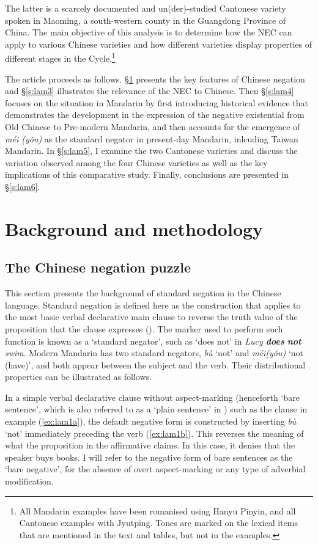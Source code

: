 \documentclass[output=paper,colorlinks,citecolor=brown,chinesefont]{langscibook}
\begin{document}
The latter is a scarcely documented and un(der)-studied Cantonese variety spoken in Maoming, a south-western county in the Guangdong Province of China. The main objective of this analysis is to determine how the NEC can apply to various Chinese varieties and how different varieties display properties of different stages in the Cycle.\footnote{All Mandarin examples have been romanised using Hanyu Pinyin, and all Cantonese examples with Jyutping. Tones are marked on the lexical items that are mentioned in the text and tables, but not in the examples.} 

The article proceeds as follows. §\ref{s:lam2} presents the key features of Chinese negation and §\ref{s:lam3} illustrates the relevance of the NEC to Chinese. Then §\ref{s:lam4} focuses on the situation in Mandarin by first introducing historical evidence that demonstrates the development in the expression of the negative existential from Old Chinese to Pre-modern Mandarin, and then accounts for the emergence of \textit{méi (yǒu)} as the standard negator in present-day Mandarin, inlcuding Taiwan Mandarin. In §\ref{s:lam5}, I examine the two Cantonese varieties and discuss the variation observed among the four Chinese varieties as well as the key implications of this comparative study. Finally, conclusions are presented in §\ref{s:lam6}.

\section{Background and methodology}\label{s:lam2}
\subsection{The Chinese negation puzzle}\label{s:lam2-1}

This section presents the background of standard negation in the Chinese language. Standard negation is defined here as the construction that applies to the most basic verbal declarative main clause to reverse the truth value of the proposition that the clause expresses (\citealt{Miestamo2005}). The marker used to perform such function is known as a `standard negator', such as `does not' in \textit{Lucy \textbf{does} \textbf{not} swim}. Modern Mandarin has two standard negators, \textit{bù} `not' and \textit{méi(yǒu)} `not (have)', and both appear between the subject and the verb. Their distributional properties can be illustrated as follows. 

In a simple verbal declarative clause without aspect-marking (henceforth `bare sentence', which is also referred to as a `plain sentence' in \citealt{Wang1965}) such as the clause in example (\ref{ex:lam1a}), the default negative form is constructed by inserting \textit{bù} `not' immediately preceding the verb (\ref{ex:lam1b}). This reverses the meaning of what the proposition in the affirmative claims. In this case, it denies that the speaker buys books. I will refer to the negative form of bare sentences as the `bare negative', for the absence of overt aspect-marking or any type of adverbial modification.
\end{document}
